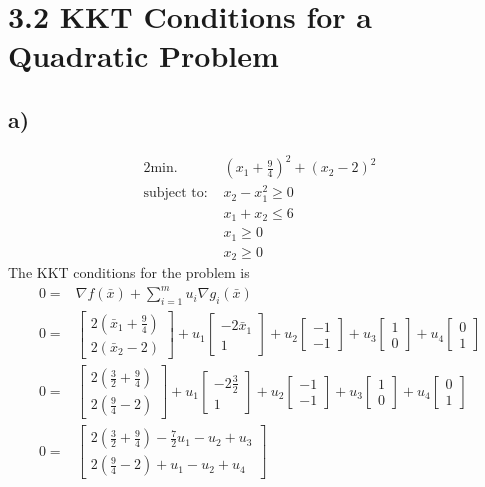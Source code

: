\documentclass{article}
\begin{document}
\section*{3.2  KKT Conditions for a Quadratic Problem}
\subsection*{a)}
	\begin{alignat}{2}
		\text{min. } & (x_1 +\frac{9}{4})^2 + (x_2 - 2)^2 \\
		\text{subject to: } & x_2-x_1^2 \geq 0\\
		& x_1 + x_2 \leq 6\\
		& x_1 \geq 0\\
		& x_2 \geq 0		
	\end{alignat}
	The KKT conditions for the problem is
	\begin{align}
		0 = & \nabla f(\bar{x}) + \sum_{i=1}^{m} u_i \nabla g_i(\bar{x})\\
		0 = & \begin{bmatrix} 2(\bar{x}_1 +\frac{9}{4}) \\ 2(\bar{x}_2 -2)\end{bmatrix} + u_1 \begin{bmatrix} -2\bar{x}_1 \\ 1 \end{bmatrix} + u_2 \begin{bmatrix} -1 \\ -1 \end{bmatrix} + u_3 \begin{bmatrix} 1 \\ 0 \end{bmatrix} + u_4 \begin{bmatrix} 0 \\ 1 \end{bmatrix}\\
		0 = & \begin{bmatrix} 2(\frac{3}{2} +\frac{9}{4}) \\ 2(\frac{9}{4} -2)\end{bmatrix} + u_1 \begin{bmatrix} -2\frac{3}{2} \\ 1 \end{bmatrix} + u_2 \begin{bmatrix} -1 \\ -1 \end{bmatrix} + u_3 \begin{bmatrix} 1 \\ 0 \end{bmatrix} + u_4 \begin{bmatrix} 0 \\ 1 \end{bmatrix} \\
		0 = & \begin{bmatrix}2(\frac{3}{2} +\frac{9}{4}) -\frac{7}{2}u_1 - u_2 +u_3 \\ 2(\frac{9}{4} -2) +u_1 -u_2 +u_4
		 \end{bmatrix}
	\end{align}
\end{document}
